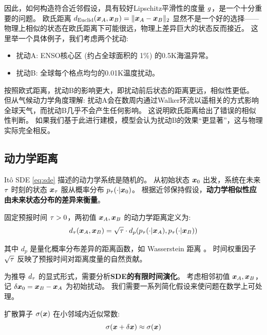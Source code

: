 因此，如何构造符合近邻假设，具有较好Lipschitz平滑性的度量 $g$，是一个十分重要的问题。
欧氏距离 $d_{\text{Euclid}}(\bm{x}_A, \bm{x}_B) = \|\bm{x}_A - \bm{x}_B\|_2$ 显然不是一个好的选择——物理上相似的状态在欧氏距离下可能很远，物理上差异巨大的状态反而接近。
这里举一个具体例子，我们考虑两个扰动:
\begin{itemize}
    \item 扰动A: ENSO核心区 (约占全球面积的 1\%) 的0.5K海温异常。
    \item 扰动B: 全球每个格点均匀的0.01K温度扰动。
\end{itemize}

按照欧式距离，扰动B的影响更大，即扰动前后状态的距离更远，相似性更低。
但从气候动力学角度理解: 扰动A会在数周内通过Walker环流以遥相关的方式影响全球天气，而扰动B几乎不会产生任何影响。
这说明欧氏距离给出了错误的相似性判断。
如果我们基于此进行建模，模型会认为扰动B的效果“更显著”，这与物理实际完全相反。

\subsection{动力学距离}

Itô SDE \eqref{eq:sde} 描述的动力学系统是随机的。
从初始状态 $\bm{x}_0$ 出发，系统在未来 $\tau$ 时刻的状态 $\bm{x}_{\tau}$ 服从概率分布 $p_{\tau}(\cdot | \bm{x}_0)$。
根据近邻保持假设，\textbf{动力学相似性应由未来状态分布的差异来衡量}。

\begin{definition}[动力学距离]
\label{def:tau_distance}
    固定预报时间 $\tau > 0$，两初值 $\bm{x}_A, \bm{x}_B$ 的动力学距离定义为:
    \begin{equation}
    \label{eq:tau_distance}
        d_{\tau}(\bm{x}_A, \bm{x}_B) = \sqrt{\tau} \cdot d_p(p_{\tau}(\cdot | \bm{x}_A), p_{\tau}(\cdot | \bm{x}_B))
    \end{equation}

    其中 $d_p$ 是量化概率分布差异的距离函数，如 Wasserstein 距离 \cite{villani2009optimal}。
    时间权重因子 $\sqrt{\tau}$ 反映了预报时间对距离度量的自然贡献。
\end{definition}

为推导 $d_{\tau}$ 的显式形式，需要分析\textbf{SDE的有限时间演化}。
考虑相邻初值 $\bm{x}_A, \bm{x}_B$，记 $\delta\bm{x}_0 = \bm{x}_B - \bm{x}_A$ 为初始扰动。
我们需要一系列简化假设来使问题在数学上可处理。

\begin{assumption}[局部平稳扩散]
\label{ass:local_stationary_diffusion}
    扩散算子 $\sigma(\bm{x})$ 在小邻域内近似常数:
    \begin{equation}
    \label{eq:local_stationary_diffusion}
        \sigma(\bm{x}+\delta\bm{x}) \approx \sigma(\bm{x})
    \end{equation}
\end{assumption}

